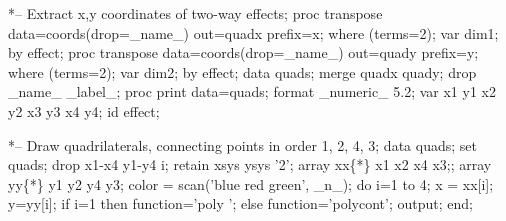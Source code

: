 \begin{listing}
*-- Extract x,y coordinates of two-way effects;
proc transpose data=coords(drop=_name_) out=quadx prefix=x;
   where (terms=2);
   var dim1;
   by effect;
proc transpose data=coords(drop=_name_) out=quady prefix=y;
   where (terms=2);
   var dim2;
   by effect;
data quads;
   merge quadx quady;
   drop _name_ _label_;
proc print data=quads;
   format _numeric_ 5.2;
   var x1 y1 x2 y2 x3 y3 x4 y4;
   id effect;

*-- Draw quadrilaterals, connecting points in order 1, 2, 4, 3;
data quads;
   set quads;
   drop x1-x4 y1-y4 i;
   retain xsys ysys '2';
   array xx\{*\} x1 x2 x4 x3;;
   array yy\{*\} y1 y2 y4 y3;
   color = scan('blue red green', _n_);
   do i=1 to 4;
      x = xx[i];  y=yy[i];
      if i=1 then function='poly    ';
             else function='polycont';
      output;
      end;

\end{listing}
